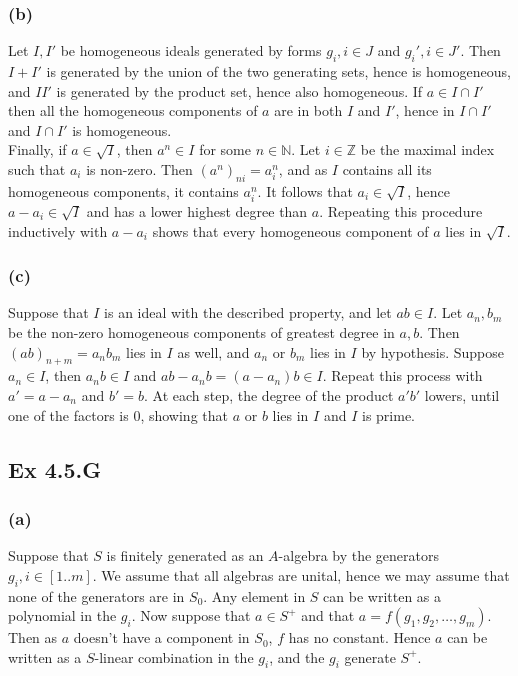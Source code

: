 \documentclass{article}
\theoremstyle{definition}
\newcommand{\Z}{\mathbb{Z}}
\newcommand{\N}{\mathbb{N}}
\begin{document}
\subsubsection*{(b)}

Let $I, I'$ be homogeneous ideals generated by forms $g_i, i \in J$ and $g_i',
i \in J'$. Then $I + I'$ is generated by the union of the two generating sets,
hence is homogeneous, and $II'$ is generated by the product set, hence also
homogeneous. If $a \in I \cap I'$ then all the homogeneous components of $a$
are in both $I$ and $I'$, hence in $I \cap I'$ and $I \cap I'$ is homogeneous. \\

Finally, if $a \in \sqrt{I}$, then $a^n \in I$ for some $n \in \N$. Let $i \in
\Z$ be the maximal index such that $a_i$ is non-zero. Then $(a^n)_{ni} =
a_i^n$, and as $I$ contains all its homogeneous components, it contains
$a_i^n$. It follows that $a_i \in \sqrt{I}$, hence $a - a_i \in \sqrt{I}$ and
has a lower highest degree than $a$. Repeating this procedure inductively with
$a - a_i$ shows that every homogeneous component of $a$ lies in $\sqrt{I}$.

\subsubsection*{(c)}

Suppose that $I$ is an ideal with the described property, and let $ab \in I$.
Let $a_n, b_m$ be the non-zero homogeneous components of greatest degree in $a,
b$. Then $(ab)_{n + m} = a_nb_m$ lies in $I$ as well, and $a_n$ or $b_m$ lies
in $I$ by hypothesis. Suppose $a_n \in I$, then $a_nb \in I$ and  $ab - a_nb =
(a - a_n)b \in I$. Repeat this process with $a' = a - a_n$ and $b' = b$. At
each step, the degree of the product $a'b'$ lowers, until one of the factors is
$0$, showing that $a$ or $b$ lies in $I$ and $I$ is prime.


\subsection*{Ex 4.5.G}
\subsubsection*{(a)}

Suppose that $S$ is finitely generated as an $A$-algebra by the generators
$g_i, i \in [1..m]$. We assume that all algebras are unital, hence we may
assume that none of the generators are in $S_0$. Any element in $S$ can be
written as a polynomial in the $g_i$. Now suppose that $a \in S^+$ and that $a
= f(g_1, g_2, \ldots, g_m)$. Then as $a$ doesn't have a component in $S_0$, $f$
has no constant. Hence $a$ can be written as a $S$-linear combination in 
the $g_i$, and the $g_i$ generate $S^{+}$. \\
\end{document}
